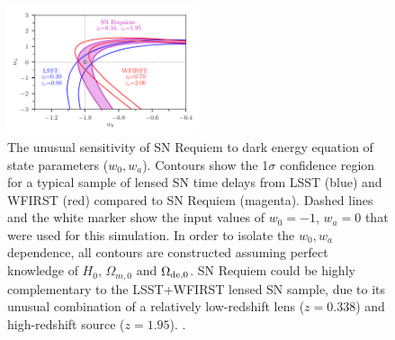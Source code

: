\documentclass[fleqn,10pt]{wlscirep}
\begin{document}
\begin{figure}
    \centering
    \includegraphics[width=0.5\textwidth]{../Figures/snrequiem_w0wa_compared_to_lsst_wfirst.pdf}
    \caption{The unusual sensitivity of SN Requiem to dark energy equation of state parameters ($w_0, w_a$). Contours show the 1$\sigma$ confidence region for a typical sample of lensed SN time delays from LSST (blue) and WFIRST (red) compared to SN Requiem (magenta). Dashed lines and the white marker show the input values of $w_0=-1$, $w_a=0$ that were used for this simulation. In order to isolate the $w_0, w_a$ dependence, all contours are constructed assuming perfect knowledge of $H_0$, $\Omega_{m,0}$ and $\Omega_{\rm de,0}$.  SN Requiem could be highly complementary to the LSST+WFIRST lensed SN sample, due to its unusual combination of a relatively low-redshift lens ($z=0.338$) and high-redshift source ($z=1.95$). . }
    \label{fig:my_label}
\end{figure}



\end{document}
